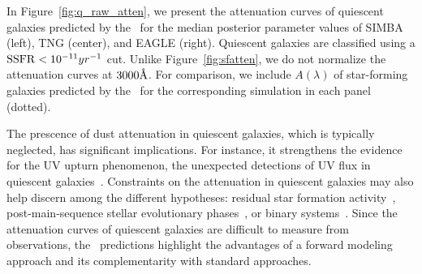 In Figure~\ref{fig:q_raw_atten}, we present the attenuation curves of
quiescent galaxies predicted by the \eda~for the median posterior parameter
values of SIMBA (left), TNG (center), and EAGLE (right). 
Quiescent galaxies are classified using a ${\rm SSFR} < 10^{-11}{yr}^{-1}$ cut. 
Unlike Figure~\ref{fig:sfatten}, we do not normalize the attenuation curves at
$3000\AA$.  
For comparison, we include $A(\lambda)$ of star-forming galaxies predicted
by the \eda~for the corresponding simulation in each panel (dotted).

The prescence of dust attenuation in quiescent galaxies, which is typically
neglected, has significant implications.  
For instance, it strengthens the evidence for the UV upturn phenomenon, the
unexpected detections of UV flux in quiescent galaxies~\citep[\eg][]{code1969,
oconnell1999, lecras2016, ali2018, dantas2021}. 
Constraints on the attenuation in quiescent galaxies may also help discern
among the different hypotheses: residual star formation
activity~\citep[\eg~][]{kaviraj2007}, post-main-sequence stellar evolutionary
phases~\citep[\eg~][]{yi1997}, or binary systems~\citep[\eg~][]{han2007}.
Since the attenuation curves of quiescent galaxies are difficult to measure
from observations, the \eda~predictions highlight the advantages of a
forward modeling approach and its complementarity with standard approaches. 

